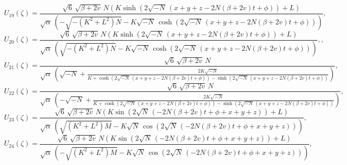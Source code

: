 \documentclass{article}
\numberwithin{equation}{section}
\begin{document}
\begin{equation}\label{U19}
    U_{19} \! \left(\zeta \right) =
\frac{\sqrt{6}\, \sqrt{\beta +2 v}\, N \left(K \sinh \! \left(2 \sqrt{-N}\, \left(x +y +z -2 N \left(\beta +2 v \right) t +\phi \right)\right)+L \right)}{\sqrt{\alpha}\, \left(-\sqrt{-\left(K^{2}+L^{2}\right) N}-K \sqrt{-N}\, \cosh \! \left(2 \sqrt{-N}\, \left(x +y +z -2 N \left(\beta +2 v \right) t +\phi \right)\right)\right)},
\end{equation}
\begin{equation}\label{U20}
    U_{20} \! \left(\zeta \right) =
\frac{\sqrt{6}\, \sqrt{\beta +2 v}\, N \left(K \sinh \! \left(2 \sqrt{-N}\, \left(x +y +z -2 N \left(\beta +2 v \right) t +\phi \right)\right)+L \right)}{\sqrt{\alpha}\, \left(\sqrt{-\left(K^{2}+L^{2}\right) N}-K \sqrt{-N}\, \cosh \! \left(2 \sqrt{-N}\, \left(x +y +z -2 N \left(\beta +2 v \right) t +\phi \right)\right)\right)},,
\end{equation}
\begin{equation}\label{U21}
U_{21} \! \left(\zeta \right) =
\frac{\sqrt{6}\, \sqrt{\beta +2 v}\, N}{\sqrt{\alpha}\, \left(\sqrt{-N}+\frac{2 K \sqrt{-N}}{K +\cosh \left(2 \sqrt{-N}\, \left(x +y +z -2 N \left(\beta +2 v \right) t +\phi \right)\right)-\sinh \left(2 \sqrt{-N}\, \left(x +y +z -2 N \left(\beta +2 v \right) t +\phi \right)\right)}\right)},
\end{equation}
\begin{equation}\label{U22}
U_{22} \! \left(\zeta \right) =
\frac{\sqrt{6}\, \sqrt{\beta +2 v}\, N}{\sqrt{\alpha}\, \left(-\sqrt{-N}+\frac{2 K \sqrt{-N}}{K +\cosh \left(2 \sqrt{-N}\, \left(x +y +z -2 N \left(\beta +2 v \right) t +\phi \right)\right)-\sinh \left(2 \sqrt{-N}\, \left(x +y +z -2 N \left(\beta +2 v \right) t +\phi \right)\right)}\right)},
\end{equation}
\begin{equation}\label{U23}
U_{23} \! \left(\zeta \right) =
\frac{\sqrt{6}\, \sqrt{\beta +2 v}\, N \left(K \sin \! \left(2 \sqrt{N}\, \left(-2 N \left(\beta +2 v \right) t +\phi +x +y +z \right)\right)+L \right)}{\sqrt{\alpha}\, \left(\sqrt{\left(K^{2}+L^{2}\right) M}-K \sqrt{N}\, \cos \! \left(2 \sqrt{N}\, \left(-2 N \left(\beta +2 v \right) t +\phi +x +y +z \right)\right)\right)},
\end{equation}
\begin{equation}\label{U24}
U_{24} \! \left(\zeta \right) =
\frac{\sqrt{6}\, \sqrt{\beta +2 v}\, N \left(K \sin \! \left(2 \sqrt{N}\, \left(-2 N \left(\beta +2 v \right) t +\phi +x +y +z \right)\right)+L \right)}{\sqrt{\alpha}\, \left(-\sqrt{\left(K^{2}+L^{2}\right) M}-K \sqrt{N}\, \cos \! \left(2 \sqrt{N}\, \left(-2 N \left(\beta +2 v \right) t +\phi +x +y +z \right)\right)\right)},
\end{equation}
\end{document}
